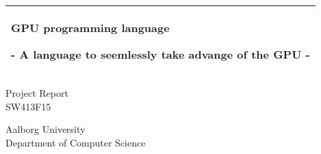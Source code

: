 %
%
%
%
%
\begin{titlepage}
  \addtolength{\hoffset}{0.5\evensidemargin-0.5\oddsidemargin} %
  \noindent%
  \begin{tabular}{@{}p{\textwidth}@{}}
    \toprule[2pt]
    \midrule
    \vspace{0.2cm}
    \begin{center}
    \Huge{\textbf{
      GPU programming language%
    }}
    \end{center}
    \begin{center}
      \Large{
        - A language to seemlessly take advange of the GPU -%
      }
    \end{center}
    \vspace{0.2cm}\\
    \midrule
    \toprule[2pt]
  \end{tabular}
  \vspace{4 cm}
  \begin{center}
    {\large
      Project Report%
    }\\
    \vspace{0.2cm}
    {\Large
      SW413F15%
    }
  \end{center}
  \vfill
  \begin{center}
  Aalborg University\\
  Department of Computer Science
  \end{center}
\end{titlepage}
\clearpage
